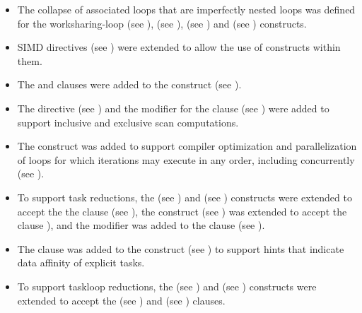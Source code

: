 \begin{itemize}
\item The collapse of associated loops that are imperfectly nested loops
      was defined for the worksharing-loop (see ),
       (see ), 
      (see ) and  (see
      ) constructs.

\item SIMD directives (see ) were extended
      to allow the use of  constructs within them.

\item The  and  clauses were added to the 
       construct (see ).

\item The  directive (see ) and the
       modifier for the  clause (see
      ) were added to support
      inclusive and exclusive scan computations.

\item The  construct was added to support compiler
      optimization and parallelization of loops for which iterations may
      execute in any order, including concurrently (see ).

\item To support task reductions, the  (see
      ) and  (see
      ) constructs were extended to
      accept the the  clause (see
      ), the 
      construct (see ) was extended
      to accept the  clause
      ), and the 
      modifier was added to the  clause (see
      ).

\item The  clause was added to the  construct
      (see ) to support hints that indicate 
      data affinity of explicit tasks.

\item To support taskloop reductions, the  (see
      ) and  (see
      ) constructs were extended
      to accept the  (see )
      and  (see )
      clauses.


\end{itemize}
